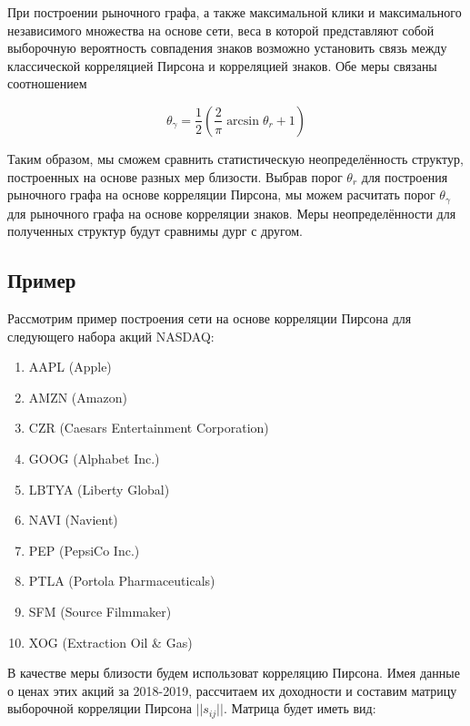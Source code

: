 При построении  рыночного графа, а также максимальной клики и максимального независимого множества на основе сети, веса в которой представляют собой выборочную вероятность совпадения знаков возможно установить связь между классической корреляцией Пирсона и корреляцией знаков\cite{signs}. Обе меры связаны соотношением

\begin{equation}
	\theta_\gamma = \frac{1}{2}\left(\frac{2}{\pi}\arcsin\theta_r +1\right)
	\label{eq:threshold}
\end{equation}

Таким образом, мы сможем сравнить статистическую неопределённость структур, построенных на основе разных мер близости. Выбрав порог $\theta_r$ для построения рыночного графа на основе корреляции Пирсона, мы можем расчитать порог $\theta_{\gamma}$ для рыночного графа на основе корреляции знаков. Меры неопределённости для полученных структур будут сравнимы дург с другом.



\subsection{Пример}

Рассмотрим пример построения сети на основе корреляции Пирсона для следующего набора акций NASDAQ: 

{ \small
\begin{enumerate}
  \item AAPL (Apple)
  \item AMZN (Amazon)
  \item CZR (Caesars Entertainment Corporation)
  \item GOOG (Alphabet Inc.)
  \item LBTYA (Liberty Global)
  \item NAVI (Navient)
  \item PEP (PepsiCo Inc.)
  \item PTLA (Portola Pharmaceuticals)
  \item SFM (Source Filmmaker)
  \item XOG (Extraction Oil \& Gas)
\end{enumerate}
}
В качестве меры близости будем использоват корреляцию Пирсона. Имея данные о ценах этих акций за 2018-2019, рассчитаем их доходности и составим матрицу выборочной корреляции Пирсона $ ||s_{ij}|| $. Матрица будет иметь вид:

